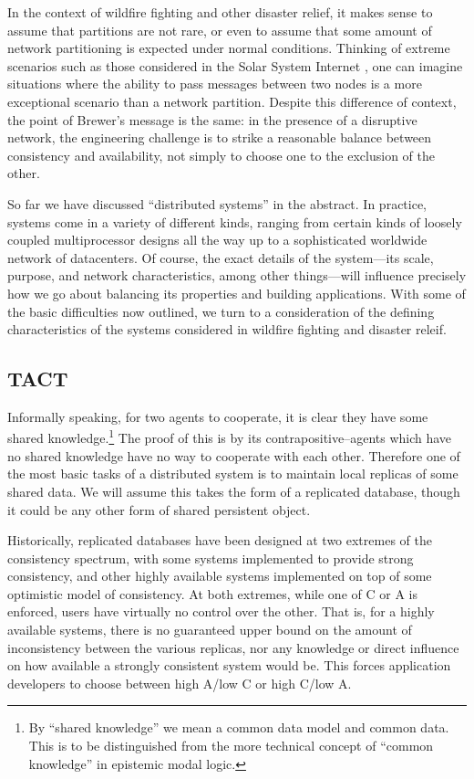 In the context of wildfire fighting and other disaster relief, it makes sense to
assume that partitions are not rare,
or even to assume that some amount of network partitioning is expected under
normal conditions. Thinking of extreme scenarios such as those considered in the
Solar System Internet \cite{2016nasaSSI}, one can imagine situations where the
ability to pass messages between two nodes is a more exceptional scenario than a
network partition. Despite this difference of context, the point of Brewer's
message is the same: in the presence of a disruptive network, the engineering
challenge is to strike a reasonable balance between consistency and
availability, not simply to choose one to the exclusion of the other.

So far we have discussed ``distributed systems'' in the abstract. In practice,
systems come in a variety of different kinds, ranging from certain kinds of
loosely coupled multiprocessor designs all the way up to a sophisticated
worldwide network of datacenters. Of course, the exact details of the
system---its scale, purpose, and network characteristics, among other
things---will influence precisely how we go about balancing its properties and
building applications. With some of the basic difficulties now outlined, we turn
to a consideration of the defining characteristics of the systems considered in
wildfire  fighting and disaster releif.


\subsection{TACT}

Informally speaking, for two agents to cooperate, it is clear they have some
shared knowledge.\footnote{By ``shared knowledge'' we mean a common data model
and common data. This is to be distinguished from the more technical concept of
``common knowledge'' in epistemic modal logic.} The proof of this is by its
contrapositive--agents which have no shared knowledge have no way to cooperate
with each other. Therefore one of the most basic tasks of a distributed system
is to maintain local replicas of some shared data. We will assume this takes the
form of a replicated database, though it could be any other form of shared
persistent object.

Historically, replicated databases have been designed at two extremes of the
consistency spectrum, with some systems implemented to provide strong
consistency, and other highly available systems implemented on top of some
optimistic model of consistency. At both extremes, while one of C or A is
enforced, users have virtually no control over the other. That is, for a highly
available systems, there is no guaranteed upper bound on the amount of
inconsistency between the various replicas, nor any knowledge or direct
influence on how available a strongly consistent system would be. This forces
application developers to choose between high A/low C or high C/low A.

